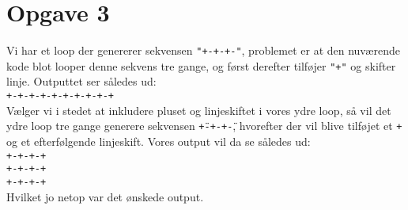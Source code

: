 \documentclass{scrartcl}
\begin{document}
\section*{Opgave 3}
Vi har et loop der genererer sekvensen \texttt{"+-+-+-"}, problemet er at den nuværende kode blot looper denne sekvens tre gange, og først derefter tilføjer \texttt{"+"} og skifter linje. Outputtet ser således ud:
\vspace{10pt}
\\
\hspace*{30pt}\texttt{+-+-+-+-+-+-+-+-+-+}
\vspace{10pt}
\\
Vælger vi i stedet at inkludere pluset og linjeskiftet i vores ydre loop, så vil det ydre loop tre gange generere sekvensen  \texttt{\"+-+-+-\"}, hvorefter der vil blive tilføjet et \texttt{+} og et efterfølgende linjeskift.
Vores output vil da se således ud:
\vspace{10pt}
\\
\hspace*{30pt}\texttt{+-+-+-+}
\\
\hspace*{30pt}\texttt{+-+-+-+}
\\
\hspace*{30pt}\texttt{+-+-+-+}
\vspace{10pt}
\\
Hvilket jo netop var det ønskede output.
\end{document}
